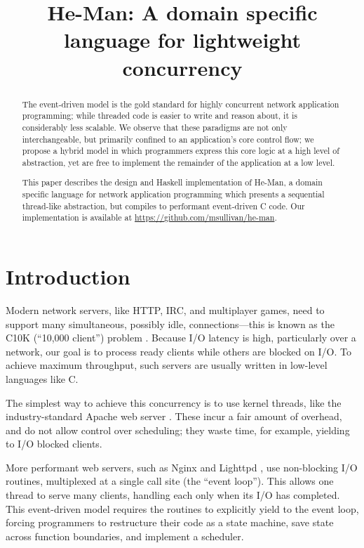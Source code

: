 \documentclass[preprint]{sigplanconf}
\title{He-Man: A domain specific language for lightweight concurrency}
\begin{document}
\maketitle


\begin{abstract}
The event-driven model is the gold standard for highly concurrent network
application programming; while threaded code is easier to write and reason
about, it is considerably less scalable. We observe that these paradigms are not
only interchangeable, but primarily confined to an application's core control
flow; we propose a hybrid model in which programmers express this core logic at
a high level of abstraction, yet are free to implement the remainder of the
application at a low level.

This paper describes the design and Haskell implementation of He-Man, a domain
specific language for network application programming which presents a
sequential thread-like abstraction, but compiles to performant event-driven C
code. Our implementation is available at
\url{https://github.com/msullivan/he-man}. %
\end{abstract}

\section{Introduction}

Modern network servers, like HTTP, IRC, and multiplayer games, need to support
many simultaneous, possibly idle, connections---this is known as the C10K
(``10,000 client'') problem \cite{Kegel}. Because I/O latency is high,
particularly over a network, our goal is to process ready clients while others
are blocked on I/O. To achieve maximum throughput, such servers are usually
written in low-level languages like C.

The simplest way to achieve this concurrency is to use kernel threads, like the
industry-standard Apache web server \cite{Apache}. These incur a fair amount of
overhead, and do not allow control over scheduling; they waste time, for
example, yielding to I/O blocked clients.

More performant web servers, such as Nginx \cite{Nginx} and Lighttpd
\cite{Lighttpd}, use non-blocking I/O routines, multiplexed at a single call
site (the ``event loop''). This allows one thread to serve many clients,
handling each only when its I/O has completed. This event-driven model requires
the routines to explicitly yield to the event loop, forcing programmers to
restructure their code as a state machine, save state across function
boundaries, and implement a scheduler. 
\end{document}
